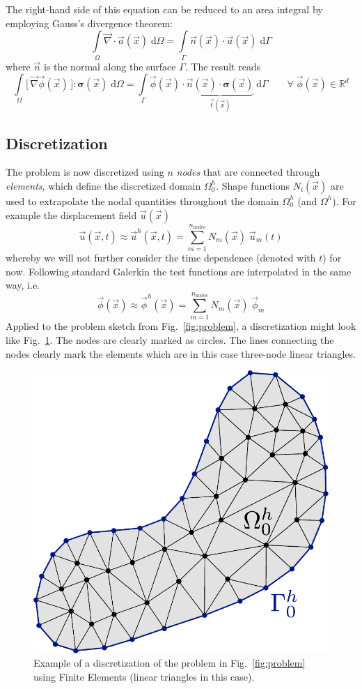 \documentclass[times,namecite]{goose-article}
\begin{document}
The right-hand side of this equation can be reduced to an area integral by employing Gauss's divergence theorem:
\begin{equation}
  \int\limits_\Omega \vec{\nabla} \cdot \vec{a}(\vec{x}) \; \mathrm{d}\Omega
  =
  \int\limits_\Gamma \vec{n}(\vec{x}) \cdot \vec{a}(\vec{x}) \; \mathrm{d}\Gamma
\end{equation}
where $\vec{n}$ is the normal along the surface $\Gamma$. The result reads
\begin{equation}
\label{eq:static:weak:final}
  \int\limits_\Omega
    \big[\, \vec{\nabla} \vec{\phi}(\vec{x}) \,\big] : \bm{\sigma}(\vec{x}) \;
  \mathrm{d}\Omega
  =
  \int\limits_\Gamma
    \vec{\phi}(\vec{x}) \cdot
    \underbrace{
      \vec{n}(\vec{x}) \cdot \bm{\sigma}(\vec{x})
    }_{
      \vec{t}(\vec{x})
    } \;
  \mathrm{d}\Gamma
  \qquad
  \forall \; \vec{\phi}(\vec{x}) \in \mathbb{R}^d
\end{equation}

\subsection{Discretization}

The problem is now discretized using $n$ \emph{nodes} that are connected through \emph{elements}, which define the discretized domain $\Omega^h_0$. Shape functions $N_i(\vec{x})$ are used to extrapolate the nodal quantities throughout the domain $\Omega^h_0$ (and $\Omega^h$). For example the displacement field $\vec{u}(\vec{x})$
\begin{equation}
  \vec{u}(\vec{x},t)
  \approx
  \vec{u}^h(\vec{x},t)
  =
  \sum_{m=1}^{n_\mathrm{nodes}} N_m (\vec{x}) \; \vec{u}_m (t)
\end{equation}
whereby we will not further consider the time dependence (denoted with $t$) for now. Following standard Galerkin the test functions are interpolated in the same way, i.e.\
\begin{equation}
\label{eq:discretization}
  \vec{\phi}(\vec{x})
  \approx
  \vec{\phi}^h(\vec{x})
  =
  \sum_{m=1}^{n_\mathrm{nodes}} N_m (\vec{x}) \; \vec{\phi}_m
\end{equation}
Applied to the problem sketch from Fig.~\ref{fig:problem}, a discretization might look like Fig.~\ref{fig:problem:discretized}. The nodes are clearly marked as circles. The lines connecting the nodes clearly mark the elements which are in this case three-node linear triangles.

\begin{figure}[htp]
  \centering
  \includegraphics[width=.25\textwidth]{figures/problem-discretized.pdf}
  \caption{Example of a discretization of the problem in Fig.~\ref{fig:problem} using Finite Elements (linear triangles in this case).}
  \label{fig:problem:discretized}
\end{figure}
\end{document}
